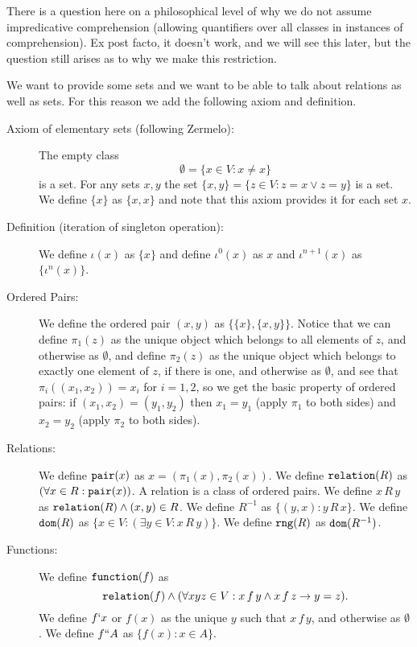 \documentclass[12pt]{article}
\begin{document}
There is a question here on a philosophical level of why we do not assume impredicative comprehension (allowing quantifiers over all classes in instances of comprehension).  Ex post facto, it doesn't work, and we will see this later, but the question still arises as to why we make this restriction.

We want to provide some sets and we want to be able to talk about relations as well as sets.  For this reason we add the following axiom and definition.

\begin{description}

\item[Axiom of elementary sets (following Zermelo):]  The empty class $$\emptyset = \{x\in V:x \neq x\}$$ is a set.  For any sets $x,y$ the set $\{x,y\} = \{z\in V :z =x \vee z=y\}$ is a set.
We define $\{x\}$ as $\{x,x\}$ and note that this axiom provides it for each set $x$.  

\item[Definition (iteration of singleton operation):]

We define $\iota(x)$ as $\{x\}$ and define $\iota^0(x)$ as $x$ and $\iota^{n+1}(x)$ as $\{\iota^n(x)\}$.

\item[Ordered Pairs:]  We define the ordered pair $(x,y)$ as $\{\{x\},\{x,y\}\}$.  Notice that we can define $\pi_1(z)$ as the unique object which belongs to all elements of $z$, and otherwise as $\emptyset$, and define $\pi_2(z)$ as the unique object which belongs to exactly one element of $z$, if there is one, and otherwise as $\emptyset$,
and see that $\pi_i((x_1,x_2)) = x_i$ for $i=1,2$, so we get the basic property of ordered pairs:  if $(x_1,x_2) = (y_1,y_2)$ then $x_1=y_1$ (apply $\pi_1$ to both sides) and $x_2=y_2$ (apply $\pi_2$ to both sides).



\item[Relations:]  We define ${\tt pair}(x)$ as $x=(\pi_1(x),\pi_2(x))$.  We define ${\tt relation}(R)$ as $(\forall x\in R:{\tt pair}(x))$.  A relation is a class of ordered pairs.  We define $x \, R\, y$ as ${\tt relation}(R) \wedge (x,y)\in R$.  We define $R^{-1}$ as $\{(y,x):y \, R\, x\}$.  We define
${\tt dom}(R)$ as $\{x\in V:(\exists y\in V:x \,R\,y)\}$.  We define ${\tt rng}(R)$ as ${\tt dom}(R^{-1})$.

\item[Functions:]  We define ${\tt function}(f)$ as $${\tt relation}(f) \wedge (\forall xyz \in V:x \,f\,y \wedge x\,f\,z \rightarrow y=z).$$   We define
$f`x$ or $f(x)$ as the unique $y$ such that $x\,f\,y$, and otherwise as $\emptyset$.  We define $f``A$ as $\{f(x):x \in A\}$.


\end{description}
\end{document}
